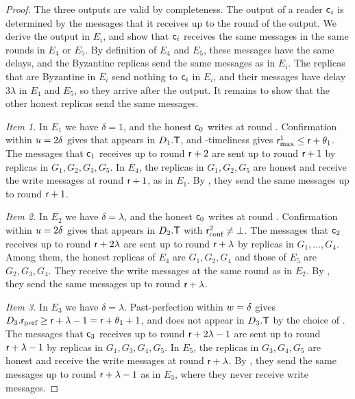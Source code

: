 \begin{proof}
    The three outputs are valid by completeness. The output of a reader
    $\textsf{c}_i$ is determined by the messages that it receives up to the round
    of the output. We derive the output in $E_i$, and show that $\textsf{c}_i$
    receives the same messages in the same rounds in $E_4$ or $E_5$. By
    definition of $E_4$ and $E_5$, these messages have the same delays, and the
    Byzantine replicas send the same messages as in $E_i$. The replicas that
    are Byzantine in $E_i$ send nothing to $\textsf{c}_i$ in $E_i$, and their
    messages have delay $3\lambda$ in $E_4$ and $E_5$, so they arrive after the
    output. It remains to show that the other honest replicas send the same
    messages.

    \emph{Item 1.}
    In $E_1$ we have $\delta = 1$, and the honest $\textsf{c}_0$ writes \tx at
    round \round. Confirmation within $u = 2\delta$ gives that \tx
    appears in $D_1.\textsf{T}$, and \parTemp-timeliness gives $\textsf{r}_\text{max}^1 \leq
    \textsf{r} + \theta_1$. The messages that $\textsf{c}_1$ receives up to round
    $\textsf{r} + 2$ are sent up to round $\textsf{r} + 1$ by replicas in $G_1, G_2,
    G_3, G_5$. In $E_4$, the replicas in $G_1, G_2, G_5$ are honest and receive
    the write messages at round $\textsf{r} + 1$, as in $E_1$. By
    , they send the same messages up to round
    $\textsf{r} + 1$.

    \emph{Item 2.}
    In $E_2$ we have $\delta = \lambda$, and the honest $\textsf{c}_0$ writes \tx
    at round \round. Confirmation within $u = 2\delta$ gives that \tx
    appears in $D_2.\textsf{T}$ with $\textsf{r}_\text{conf}^2 \neq \bot$. The messages that
    $\textsf{c}_2$ receives up to round $\textsf{r} + 2\lambda$ are sent up to round
    $\textsf{r} + \lambda$ by replicas in $G_1, \ldots, G_4$. Among them, the
    honest replicas of $E_4$ are $G_1, G_2, G_4$ and those of $E_5$ are $G_2,
    G_3, G_4$. They receive the write messages at the same round as in $E_2$.
    By , they send the same messages up to round
    $\textsf{r} + \lambda$.

    \emph{Item 3.}
    In $E_3$ we have $\delta = \lambda$. Past-perfection within $w =
    \delta$ gives $D_3.\textsf{r}_\text{perf} \geq \textsf{r} + \lambda - 1 = \textsf{r} + \theta_1 +
    1$, and \tx does not appear in $D_3.\textsf{T}$ by the choice of \tx. The
    messages that $\textsf{c}_3$ receives up to round $\textsf{r} + 2\lambda - 1$ are
    sent up to round $\textsf{r} + \lambda - 1$ by replicas in $G_1, G_3, G_4, G_5$.
    In $E_5$, the replicas in $G_3, G_4, G_5$ are honest and receive the write
    messages at round $\textsf{r} + \lambda$. By ,
    they send the same messages up to round $\textsf{r} + \lambda - 1$ as in $E_3$,
    where they never receive write messages.
\end{proof}


